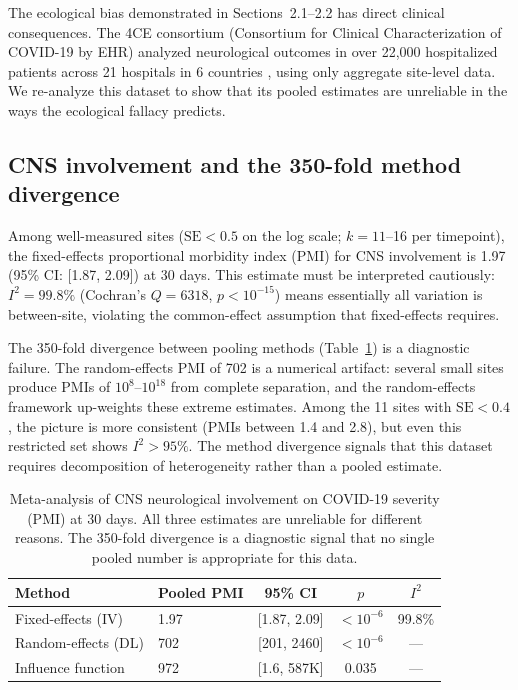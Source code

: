 \documentclass{article}
\begin{document}
The ecological bias demonstrated in Sections~2.1--2.2 has direct clinical
consequences.  The 4CE consortium (Consortium for Clinical Characterization
of COVID-19 by EHR) analyzed neurological outcomes in over 22,000
hospitalized patients across 21 hospitals in 6 countries
\cite{four_ce_neuro2021}, using only aggregate site-level data.  We
re-analyze this dataset to show that its pooled estimates are unreliable
in the ways the ecological fallacy predicts.


\subsection{CNS involvement and the 350-fold method divergence}

Among well-measured sites ($\text{SE} < 0.5$ on the log scale; $k = 11$--16
per timepoint), the fixed-effects proportional morbidity index (PMI) for CNS
involvement is 1.97 (95\% CI: [1.87, 2.09]) at 30 days.  This estimate must
be interpreted cautiously: $I^2 = 99.8\%$ (Cochran's $Q = 6318$, $p <
10^{-15}$) means essentially all variation is between-site, violating the
common-effect assumption that fixed-effects requires.

The 350-fold divergence between pooling methods (Table~\ref{tab:meta}) is a
diagnostic failure.  The random-effects PMI of 702 is a numerical artifact:
several small sites produce PMIs of $10^{8}$--$10^{18}$ from complete
separation, and the random-effects framework up-weights these extreme
estimates.  Among the 11 sites with $\text{SE} < 0.4$, the picture is more
consistent (PMIs between 1.4 and 2.8), but even this restricted set shows
$I^2 > 95\%$.  The method divergence signals that this dataset requires
decomposition of heterogeneity rather than a pooled estimate.

\begin{table}[t]
\centering
\caption{Meta-analysis of CNS neurological involvement on COVID-19 severity
(PMI) at 30 days.  All three estimates are unreliable for different reasons.
The 350-fold divergence is a diagnostic signal that no single pooled number
is appropriate for this data.}
\label{tab:meta}
\begin{tabular}{llccc}
\toprule
Method & Pooled PMI & 95\% CI & $p$ & $I^2$ \\
\midrule
Fixed-effects (IV) & 1.97 & [1.87, 2.09] & $< 10^{-6}$ & 99.8\% \\
Random-effects (DL) & 702 & [201, 2460] & $< 10^{-6}$ & --- \\
Influence function & 972 & [1.6, 587K] & 0.035 & --- \\
\bottomrule
\end{tabular}
\end{table}
\end{document}
